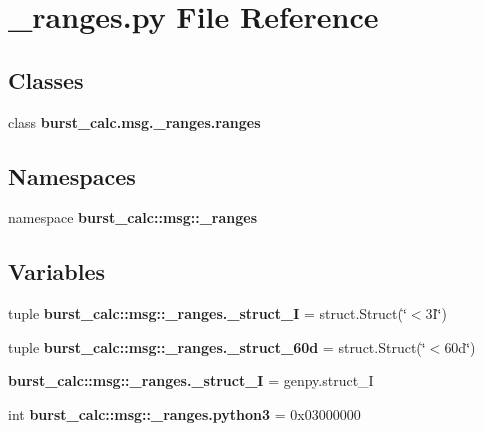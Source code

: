 \section{\-\_\-ranges.\-py \-File \-Reference}
\label{__ranges_8py}
\subsection*{\-Classes}
\begin{DoxyCompactItemize}
\item 
class {\bf burst\-\_\-calc.\-msg.\-\_\-ranges.\-ranges}
\end{DoxyCompactItemize}
\subsection*{\-Namespaces}
\begin{DoxyCompactItemize}
\item 
namespace {\bf burst\-\_\-calc\-::msg\-::\-\_\-ranges}
\end{DoxyCompactItemize}
\subsection*{\-Variables}
\begin{DoxyCompactItemize}
\item 
tuple {\bf burst\-\_\-calc\-::msg\-::\-\_\-ranges.\-\_\-struct\-\_\-I} = struct.\-Struct(\char`\"{}$<$3\-I\char`\"{})
\item 
tuple {\bf burst\-\_\-calc\-::msg\-::\-\_\-ranges.\-\_\-struct\-\_\-60d} = struct.\-Struct(\char`\"{}$<$60d\char`\"{})
\item 
{\bf burst\-\_\-calc\-::msg\-::\-\_\-ranges.\-\_\-struct\-\_\-\-I} = genpy.\-struct\-\_\-\-I
\item 
int {\bf burst\-\_\-calc\-::msg\-::\-\_\-ranges.\-python3} = 0x03000000
\end{DoxyCompactItemize}
